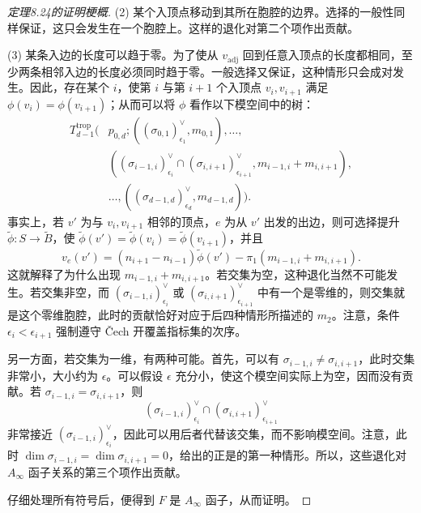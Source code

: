 \begin{proof}[定理8.24的证明梗概]
(2) 某个入顶点移动到其所在胞腔的边界。选择的一般性同样保证，这只会发生在一个胞腔上。这样的退化对第二个项作出贡献。

(3) 某条入边的长度可以趋于零。为了使从 $v_{\mathrm{adj}}$ 回到任意入顶点的长度都相同，至少两条相邻入边的长度必须同时趋于零。一般选择又保证，这种情形只会成对发生。因此，存在某个 $i$，使第 $i$ 与第 $i+1$ 个入顶点 $v_i,v_{i+1}$ 满足 $\phi(v_i)=\phi(v_{i+1})$；从而可以将 $\phi$ 看作以下模空间中的树：
\[
\begin{aligned}
T_{d-1}^{\mathrm{trop}}\bigl(&p_{0,d};
((\sigma_{0,1})_{\epsilon_1}^\vee,m_{0,1}),\ldots,\\
&((\sigma_{i-1,i})_{\epsilon_i}^\vee
\cap(\sigma_{i,i+1})_{\epsilon_{i+1}}^\vee,
m_{i-1,i}+m_{i,i+1}),\\
&\ldots,((\sigma_{d-1,d})_{\epsilon_d}^\vee,m_{d-1,d})\bigr).
\end{aligned}
\]
事实上，若 $v'$ 为与 $v_i,v_{i+1}$ 相邻的顶点，$e$ 为从 $v'$ 出发的出边，则可选择提升 $\widetilde\phi\colon S\to\widetilde B$，使 $\widetilde\phi(v')=\widetilde\phi(v_i)=\widetilde\phi(v_{i+1})$，并且
\[
v_e(v')=(n_{i+1}-n_{i-1})\widetilde\phi(v')
-\pi_1(m_{i-1,i}+m_{i,i+1}).
\]
这就解释了为什么出现 $m_{i-1,i}+m_{i,i+1}$。若交集为空，这种退化当然不可能发生。若交集非空，而 $(\sigma_{i-1,i})_{\epsilon_i}^\vee$ 或 $(\sigma_{i,i+1})_{\epsilon_{i+1}}^\vee$ 中有一个是零维的，则交集就是这个零维胞腔，此时的贡献恰好对应于后四种情形所描述的 $m_2$。注意，条件 $\epsilon_i<\epsilon_{i+1}$ 强制遵守 \v{C}ech 开覆盖指标集的次序。

另一方面，若交集为一维，有两种可能。首先，可以有 $\sigma_{i-1,i}\ne\sigma_{i,i+1}$，此时交集非常小，大小约为 $\epsilon$。可以假设 $\epsilon$ 充分小，使这个模空间实际上为空，因而没有贡献。若 $\sigma_{i-1,i}=\sigma_{i,i+1}$，则
\[
(\sigma_{i-1,i})_{\epsilon_i}^\vee
\cap(\sigma_{i,i+1})_{\epsilon_{i+1}}^\vee
\]
非常接近 $(\sigma_{i-1,i})_{\epsilon_i}^\vee$，因此可以用后者代替该交集，而不影响模空间。注意，此时 $\dim\sigma_{i-1,i}=\dim\sigma_{i,i+1}=0$，给出的正是的第一种情形。所以，这些退化对 $A_\infty$ 函子关系的第三个项作出贡献。

仔细处理所有符号后，便得到 $F$ 是 $A_\infty$ 函子，从而证明。
\end{proof}

